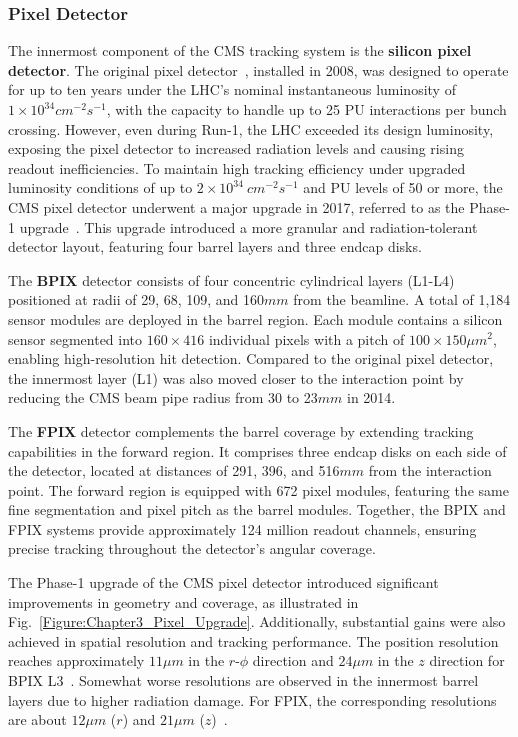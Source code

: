 \newpage
\subsubsection{Pixel Detector}

The innermost component of the \ac{CMS} tracking system is the \textbf{silicon pixel detector}. The original pixel detector~\cite{LHC_CMS}, installed in 2008, was designed to operate for up to ten years under the \ac{LHC}’s nominal instantaneous luminosity of $1 \times 10^{34}\unit{cm}^{-2}\unit{s}^{-1}$, with the capacity to handle up to 25 \ac{PU} interactions per bunch crossing. However, even during Run-1, the \ac{LHC} exceeded its design luminosity, exposing the pixel detector to increased radiation levels and causing rising readout inefficiencies. To maintain high tracking efficiency under upgraded luminosity conditions of up to $2 \times 10^{34}~\unit{cm}^{-2}\unit{s}^{-1}$ and \ac{PU} levels of 50 or more, the \ac{CMS} pixel detector underwent a major upgrade in 2017, referred to as the Phase-1 upgrade~\cite{CMS_Detector_Run3, CMS_Tracker_Phase1_Upgrade,CMS_Tracker_Phase1_Upgrade_2}. This upgrade introduced a more granular and radiation-tolerant detector layout, featuring four barrel layers and three endcap disks.

The \textbf{\ac{BPIX}} detector consists of four concentric cylindrical layers (L1-L4) positioned at radii of 29, 68, 109, and 160$\unit{mm}$ from the beamline. A total of 1,184 sensor modules are deployed in the barrel region. Each module contains a silicon sensor segmented into $160 \times 416$ individual pixels with a pitch of $100 \times 150\unit{\mu m}^2$, enabling high-resolution hit detection. Compared to the original pixel detector, the innermost layer (L1) was also moved closer to the interaction point by reducing the \ac{CMS} beam pipe radius from 30 to 23$\unit{mm}$ in 2014. 

The \textbf{\ac{FPIX}} detector complements the barrel coverage by extending tracking capabilities in the forward region. It comprises three endcap disks on each side of the detector, located at distances of 291, 396, and 516$\unit{mm}$ from the interaction point. The forward region is equipped with 672 pixel modules, featuring the same fine segmentation and pixel pitch as the barrel modules. Together, the \ac{BPIX} and \ac{FPIX} systems provide approximately 124 million readout channels, ensuring precise tracking throughout the detector’s angular coverage.

The Phase-1 upgrade of the \ac{CMS} pixel detector introduced significant improvements in geometry and coverage, as illustrated in Fig.~\ref{Figure:Chapter3_Pixel_Upgrade}. Additionally, substantial gains were also achieved in spatial resolution and tracking performance. The position resolution reaches approximately $11\unit{\mu m}$ in the $r$-$\phi$ direction and $24\unit{\mu m}$ in the $z$ direction for \ac{BPIX} L3~\cite{CMS_Detector_Run3}. Somewhat worse resolutions are observed in the innermost barrel layers due to higher radiation damage. For \ac{FPIX}, the corresponding resolutions are about $12\unit{\mu m}$ ($r$) and $21\unit{\mu m}$ ($z$)~\cite{CMS_Detector_Run3}. 

